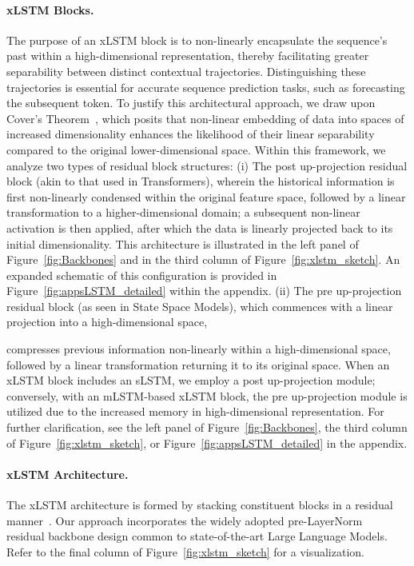 \paragraph{xLSTM Blocks.}
\label{sec:xLSTMblock}
The purpose of an xLSTM block is to non-linearly encapsulate the sequence’s past within a high-dimensional representation, thereby facilitating greater separability between distinct contextual trajectories. Distinguishing these trajectories is essential for accurate sequence prediction tasks, such as forecasting the subsequent token. To justify this architectural approach, we draw upon Cover’s Theorem~\citep{Cover:65}, which posits that non-linear embedding of data into spaces of increased dimensionality enhances the likelihood of their linear separability compared to the original lower-dimensional space. Within this framework, we analyze two types of residual block structures: (i) The post up-projection residual block (akin to that used in Transformers), wherein the historical information is first non-linearly condensed within the original feature space, followed by a linear transformation to a higher-dimensional domain; a subsequent non-linear activation is then applied, after which the data is linearly projected back to its initial dimensionality. This architecture is illustrated in the left panel of Figure~\ref{fig:Backbones} and in the third column of Figure~\ref{fig:xlstm_sketch}. An expanded schematic of this configuration is provided in Figure~\ref{fig:appsLSTM_detailed} within the appendix. (ii) The pre up-projection residual block (as seen in State Space Models), which commences with a linear projection into a high-dimensional space,

compresses previous information non-linearly within a high-dimensional space, followed by a linear transformation returning it to its original space. When an xLSTM block includes an sLSTM, we employ a post up-projection module; conversely, with an mLSTM-based xLSTM block, the pre up-projection module is utilized due to the increased memory in high-dimensional representation. For further clarification, see the left panel of Figure~\ref{fig:Backbones}, the third column of Figure~\ref{fig:xlstm_sketch}, or Figure~\ref{fig:appsLSTM_detailed} in the appendix.

\paragraph{xLSTM Architecture. }
\label{sec:xLSTMarchitecure}
The xLSTM architecture is formed by stacking constituent blocks in a residual manner~\citep{Srivastava:15,He:16}. Our approach incorporates the widely adopted pre-LayerNorm~\citep{Ba:16b} residual backbone design common to state-of-the-art Large Language Models. Refer to the final column of Figure~\ref{fig:xlstm_sketch} for a visualization.

